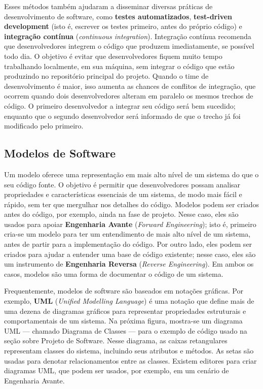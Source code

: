 \documentclass[
  11pt,
  twoside]{book}
\begin{document}
Esses métodos também ajudaram a disseminar diversas práticas de
desenvolvimento de software, como \textbf{testes automatizados},
\textbf{test-driven development} (isto é, escrever os testes primeiro,
antes do próprio código) e \textbf{integração contínua}
(\emph{continuous integration}). Integração contínua recomenda que
desenvolvedores integrem o código que produzem imediatamente, se
possível todo dia. O objetivo é evitar que desenvolvedores fiquem muito
tempo trabalhando localmente, em sua máquina, sem integrar o código que
estão produzindo no repositório principal do projeto. Quando o time de
desenvolvimento é maior, isso aumenta as chances de conflitos de
integração, que ocorrem quando dois desenvolvedores alteram em paralelo
os mesmos trechos de código. O primeiro desenvolvedor a integrar seu
código será bem sucedido; enquanto que o segundo desenvolvedor será
informado de que o trecho já foi modificado pelo primeiro.

\hypertarget{modelos-de-software}{%
\subsection{Modelos de Software}\label{modelos-de-software}}

 Um modelo oferece uma representação em mais
alto nível de um sistema do que o seu código fonte. O objetivo é
permitir que desenvolvedores possam analisar propriedades e
características essenciais de um sistema, de modo mais fácil e rápido,
sem ter que mergulhar nos detalhes do código. Modelos podem ser criados
antes do código, por exemplo, ainda na fase de projeto. Nesse caso, eles
são usados para apoiar \textbf{Engenharia Avante} (\emph{Forward
Engineering}); isto é, primeiro cria-se um modelo para ter um
entendimento de mais alto nível de um sistema, antes de partir para a
implementação do código. Por outro lado, eles podem ser criados para
ajudar a entender uma base de código existente; nesse caso, eles são um
instrumento de \textbf{Engenharia Reversa} (\emph{Reverse Engineering}).
Em ambos os casos, modelos são uma forma de documentar o código de um
sistema.

 Frequentemente, modelos de software são baseados em notações
gráficas. Por exemplo, \textbf{UML} (\emph{Unified Modelling Language})
é uma notação que define mais de uma dezena de diagramas gráficos para
representar propriedades estruturais e comportamentais de um sistema. Na
próxima figura, mostra-se um diagrama UML --- chamado Diagrama de
Classes --- para o exemplo de código usado na seção sobre Projeto de
Software. Nesse diagrama, as caixas retangulares representam classes do
sistema, incluindo seus atributos e métodos. As setas são usadas para
denotar relacionamentos entre as classes. Existem editores para criar
diagramas UML, que podem ser usados, por exemplo, em um cenário de
Engenharia Avante.
\end{document}
